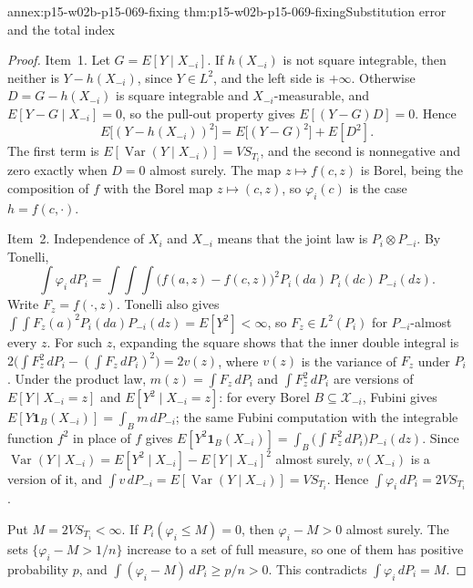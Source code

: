 \begin{annexitem}{annex:p15-w02b-p15-069-fixing}
 {thm:p15-w02b-p15-069-fixing}{Substitution error and the total index}
\begin{proof}
Item~1. Let \(G=E[Y\mid X_{-i}]\). If \(h(X_{-i})\) is not square
integrable, then neither is \(Y-h(X_{-i})\), since \(Y\in L^2\), and the
left side is \(+\infty\). Otherwise \(D=G-h(X_{-i})\) is square integrable
and \(X_{-i}\)-measurable, and \(E[Y-G\mid X_{-i}]=0\), so the pull-out
property gives \(E[(Y-G)D]=0\). Hence
\[
 E\bigl[(Y-h(X_{-i}))^2\bigr]=E\bigl[(Y-G)^2\bigr]+E[D^2].
\]
The first term is \(E[\operatorname{Var}(Y\mid X_{-i})]=VS_{T_i}\),
and the second is nonnegative and zero exactly when \(D=0\) almost
surely. The map \(z\mapsto f(c,z)\) is Borel, being the composition of
\(f\) with the Borel map \(z\mapsto(c,z)\), so \(\varphi_i(c)\) is the
case \(h=f(c,\cdot)\).

Item~2. Independence of \(X_i\) and \(X_{-i}\) means that the joint law
is \(P_i\otimes P_{-i}\). By Tonelli,
\[
 \int\varphi_i\,dP_i
 =\int\!\!\int\!\!\int\bigl(f(a,z)-f(c,z)\bigr)^2
   P_i(da)\,P_i(dc)\,P_{-i}(dz).
\]
Write \(F_z=f(\cdot,z)\). Tonelli also gives
\(\int\!\int F_z(a)^2P_i(da)P_{-i}(dz)=E[Y^2]<\infty\), so \(F_z\in
L^2(P_i)\) for \(P_{-i}\)-almost every \(z\). For such \(z\), expanding the
square shows that the inner double integral is
\(2\bigl(\int F_z^2\,dP_i-(\int F_z\,dP_i)^2\bigr)=2v(z)\), where \(v(z)\) is
the variance of \(F_z\) under \(P_i\). Under the product law,
\(m(z)=\int F_z\,dP_i\) and \(\int F_z^2\,dP_i\) are versions of
\(E[Y\mid X_{-i}=z]\) and \(E[Y^2\mid X_{-i}=z]\): for every Borel
\(B\subseteq\mathcal X_{-i}\), Fubini gives
\(E[Y\mathbf 1_B(X_{-i})]=\int_B m\,dP_{-i}\); the same Fubini computation
with the integrable function \(f^2\) in place of \(f\) gives
\(E[Y^2\mathbf 1_B(X_{-i})]=\int_B\bigl(\int F_z^2\,dP_i\bigr)P_{-i}(dz)\).
Since \(\operatorname{Var}(Y\mid X_{-i})=E[Y^2\mid X_{-i}]-E[Y\mid X_{-i}]^2\)
almost surely, \(v(X_{-i})\) is a version of it, and
\(\int v\,dP_{-i}=E[\operatorname{Var}(Y\mid X_{-i})]=VS_{T_i}\). Hence
\(\int\varphi_i\,dP_i=2VS_{T_i}\).

Put \(M=2VS_{T_i}<\infty\). If \(P_i(\varphi_i\leq M)=0\), then
\(\varphi_i-M>0\) almost surely. The sets \(\{\varphi_i-M>1/n\}\) increase
to a set of full measure, so one of them has positive probability
\(p\), and \(\int(\varphi_i-M)\,dP_i\geq p/n>0\). This contradicts
\(\int\varphi_i\,dP_i=M\).


\end{proof}
\end{annexitem}

